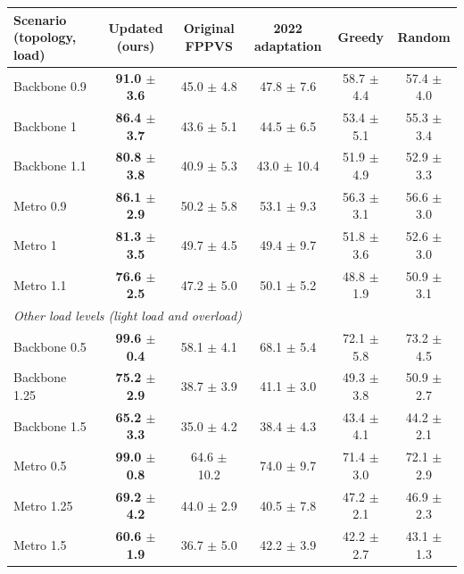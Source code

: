 \begin{tabular}{lccccc}
\toprule
Scenario (topology, load) & Updated (ours) & Original FPPVS & 2022 adaptation & Greedy & Random \\
\midrule
Backbone 0.9 & \textbf{91.0 $\pm$ 3.6} & 45.0 $\pm$ 4.8 & 47.8 $\pm$ 7.6 & 58.7 $\pm$ 4.4 & 57.4 $\pm$ 4.0 \\
Backbone 1 & \textbf{86.4 $\pm$ 3.7} & 43.6 $\pm$ 5.1 & 44.5 $\pm$ 6.5 & 53.4 $\pm$ 5.1 & 55.3 $\pm$ 3.4 \\
Backbone 1.1 & \textbf{80.8 $\pm$ 3.8} & 40.9 $\pm$ 5.3 & 43.0 $\pm$ 10.4 & 51.9 $\pm$ 4.9 & 52.9 $\pm$ 3.3 \\
Metro 0.9 & \textbf{86.1 $\pm$ 2.9} & 50.2 $\pm$ 5.8 & 53.1 $\pm$ 9.3 & 56.3 $\pm$ 3.1 & 56.6 $\pm$ 3.0 \\
Metro 1 & \textbf{81.3 $\pm$ 3.5} & 49.7 $\pm$ 4.5 & 49.4 $\pm$ 9.7 & 51.8 $\pm$ 3.6 & 52.6 $\pm$ 3.0 \\
Metro 1.1 & \textbf{76.6 $\pm$ 2.5} & 47.2 $\pm$ 5.0 & 50.1 $\pm$ 5.2 & 48.8 $\pm$ 1.9 & 50.9 $\pm$ 3.1 \\
\midrule \multicolumn{6}{l}{\emph{Other load levels (light load and overload)}} \\
Backbone 0.5 & \textbf{99.6 $\pm$ 0.4} & 58.1 $\pm$ 4.1 & 68.1 $\pm$ 5.4 & 72.1 $\pm$ 5.8 & 73.2 $\pm$ 4.5 \\
Backbone 1.25 & \textbf{75.2 $\pm$ 2.9} & 38.7 $\pm$ 3.9 & 41.1 $\pm$ 3.0 & 49.3 $\pm$ 3.8 & 50.9 $\pm$ 2.7 \\
Backbone 1.5 & \textbf{65.2 $\pm$ 3.3} & 35.0 $\pm$ 4.2 & 38.4 $\pm$ 4.3 & 43.4 $\pm$ 4.1 & 44.2 $\pm$ 2.1 \\
Metro 0.5 & \textbf{99.0 $\pm$ 0.8} & 64.6 $\pm$ 10.2 & 74.0 $\pm$ 9.7 & 71.4 $\pm$ 3.0 & 72.1 $\pm$ 2.9 \\
Metro 1.25 & \textbf{69.2 $\pm$ 4.2} & 44.0 $\pm$ 2.9 & 40.5 $\pm$ 7.8 & 47.2 $\pm$ 2.1 & 46.9 $\pm$ 2.3 \\
Metro 1.5 & \textbf{60.6 $\pm$ 1.9} & 36.7 $\pm$ 5.0 & 42.2 $\pm$ 3.9 & 42.2 $\pm$ 2.7 & 43.1 $\pm$ 1.3 \\
\bottomrule
\end{tabular}